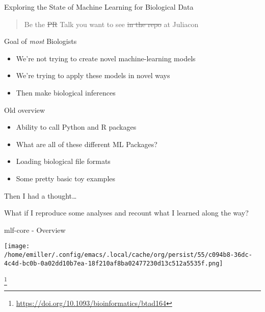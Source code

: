 \documentclass[bigger]{beamer}
\begin{document}
\begin{frame}[label={sec:orgeec213b}]{Exploring the State of Machine Learning for Biological Data}
\begin{quote}
Be the \sout{PR} Talk you want to see \sout{in the repo} at Juliacon
\end{quote}
\end{frame}

\begin{frame}[label={sec:orgd5c6aea}]{Goal of \emph{most} Biologists}
\begin{itemize}
\item We're not trying to create novel machine-learning models
\item We're trying to apply these models in novel ways
\item Then make biological inferences
\end{itemize}
\end{frame}


\begin{frame}[label={sec:org32aad69}]{Old overview}
\begin{itemize}
\item Ability to call Python and R packages
\item What are all of these different ML Packages?
\item Loading biological file formats
\item Some pretty basic toy examples
\end{itemize}
\end{frame}

\begin{frame}[label={sec:org840a946}]{Then I had a thought\ldots{}}
\pause

What if I reproduce some analyses and recount what I learned along the way?
\end{frame}

\begin{frame}[label={sec:org98395b4}]{mlf-core - Overview}
\begin{center}
\texttt{[image: /home/emiller/.config/emacs/.local/cache/org/persist/55/c094b8-36dc-4c4d-bc0b-0a02dd10b7ea-18f210af8ba02477230d13c512a5535f.png]}
\end{center} \footnote{\url{https://doi.org/10.1093/bioinformatics/btad164}}

\end{frame}
\end{document}
